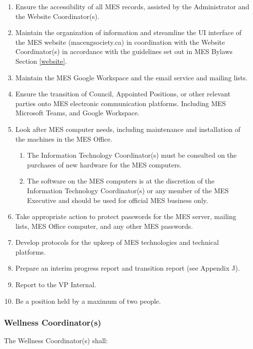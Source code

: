\begin{enumerate}
 \item
  Ensure the accessibility of all MES records, assisted by the Administrator and the Website Coordinator(s).
 \item
  Maintain the organization of information and streamline the UI interface of the MES website (macengsociety.ca) in coordination with the Website Coordinator(s) in accordance with the guidelines set out in MES Bylaws Section \ref{website}.
 \item
  Maintain the MES Google Workspace and the email service and mailing lists.
 \item
  Ensure the transition of Council, Appointed Positions, or other relevant parties onto MES electronic communication platforms. Including MES Microsoft Teams, and Google Workspace.
 \item
  Look after MES computer needs, including maintenance and installation of the machines in the MES Office.

  \begin{enumerate}
   \item
    The Information Technology Coordinator(s) must be consulted on the purchases of new hardware for the MES computers.
   \item
    The software on the MES computers is at the discretion of the Information Technology Coordinator(s) or any member of the MES Executive and should be used for official MES business only.
  \end{enumerate}
 \item
  Take appropriate action to protect passwords for the MES server, mailing lists, MES Office computer, and any other MES passwords.
 \item
  Develop protocols for the upkeep of MES technologies and technical platforms.
 \item
  Prepare an interim progress report and transition report (see Appendix J). %
 \item
  Report to the VP Internal.
 \item
  Be a position held by a maximum of two people.

\end{enumerate}

\subsubsection{Wellness Coordinator(s)}
\label{wellness-coordinators}
The Wellness Coordinator(s) shall:


